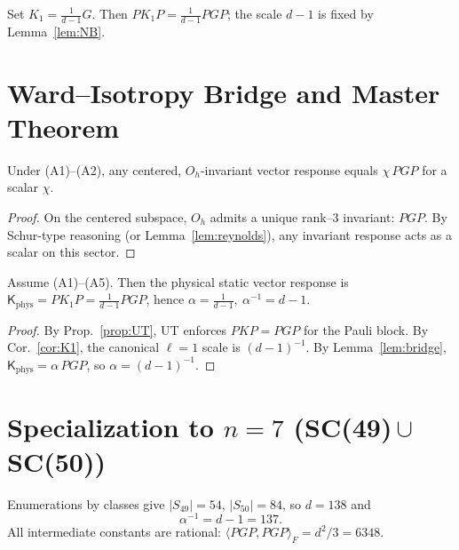 \begin{corollary}[Canonical $\ell=1$ operator]
\label{cor:K1}
Set \(K_1=\frac{1}{d-1}G\). Then \(PK_1P=\frac{1}{d-1}PGP\); the scale \(d-1\) is fixed by Lemma~\ref{lem:NB}.
\end{corollary}

\section{Ward–Isotropy Bridge and Master Theorem}
\begin{lemma}[Bridge]
\label{lem:bridge}
Under (A1)–(A2), any centered, \(O_h\)-invariant vector response equals \(\chi\,PGP\) for a scalar \(\chi\).
\end{lemma}
\begin{proof}
On the centered subspace, \(O_h\) admits a unique rank–3 invariant: \(PGP\). By Schur-type reasoning (or Lemma~\ref{lem:reynolds}), any invariant response acts as a scalar on this sector.
\end{proof}

\begin{theorem}[Master Theorem: $\alpha^{-1}=d-1$]
\label{thm:master}
Assume (A1)–(A5). Then the physical static vector response is
\(
\mathsf{K}_{\!\mathrm{phys}}=PK_1P=\frac{1}{d-1}PGP
\),
hence \(
\alpha=\frac{1}{d-1},\ \alpha^{-1}=d-1
\).
\end{theorem}
\begin{proof}
By Prop.~\ref{prop:UT}, UT enforces \(PKP=PGP\) for the Pauli block. By Cor.~\ref{cor:K1}, the canonical \(\ell=1\) scale is \((d-1)^{-1}\). By Lemma~\ref{lem:bridge}, \(\mathsf{K}_{\!\mathrm{phys}}=\alpha\,PGP\), so \(\alpha=(d-1)^{-1}\).
\end{proof}

\section{Specialization to $n=7$ (SC(49)\,$\cup$\,SC(50))}
Enumerations by classes give \(|S_{49}|=54\), \(|S_{50}|=84\), so \(d=138\) and
\[
\boxed{\ \alpha^{-1}=d-1=137.\ }
\]
All intermediate constants are rational: \(\langle PGP,PGP\rangle_F=d^2/3=6348\).

